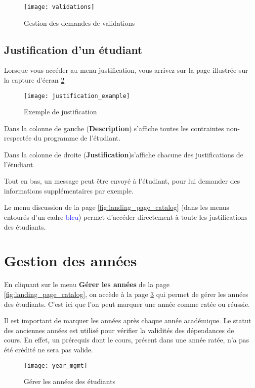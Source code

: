 \begin{figure}
\centering
\caption{Gestion des demandes de validations}
\label{fig:validations}
\texttt{[image: validations]}
\end{figure}
\subsection{Justification d'un étudiant}
Lorsque vous accéder au menu justification, vous arrivez sur la page illustrée sur la capture d'écran \ref{fig:justification_example}

\begin{figure}
\centering
\caption{Exemple de justification}
\label{fig:justification_example}
\texttt{[image: justification\_example]}
\end{figure}

Dans la colonne de gauche (\textbf{Description}) s'affiche toutes les contraintes non-respectée du programme de l'étudiant. 

Dans la colonne de droite (\textbf{Justification})s'affiche chacune des justifications de l'étudiant.

Tout en bas, un message peut être envoyé à l'étudiant, pour lui demander des informations supplémentaires par exemple. 

Le menu discussion de la page \ref{fig:landing_page_catalog} (dans les menus entourés d'un cadre \textcolor{blue}{bleu}) permet d'accéder directement à toute les justifications des étudiants.

\section{Gestion des années}

En cliquant sur le menu \textbf{Gérer les années} de la page \ref{fig:landing_page_catalog}, on accède à la page \ref{fig:manage_years} qui permet de gérer les années des étudiants. C'est ici que l'on peut marquer une année comme ratée ou réussie. 

Il est important de marquer les années après chaque année académique. Le statut des anciennes années est utilisé pour vérifier la validités des dépendances de cours. En effet, un prérequis dont le cours, présent dans une année ratée, n'a pas été crédité ne sera pas valide. 

\begin{figure}
\centering
\caption{Gérer les années des étudiants}
\label{fig:manage_years}
\texttt{[image: year\_mgmt]}
\end{figure}

